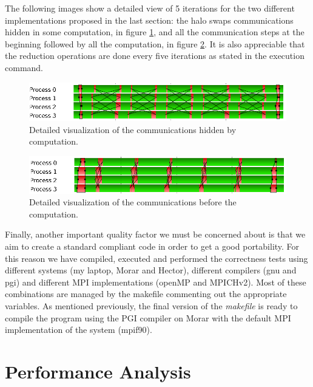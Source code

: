 \documentclass[12pt, a4paper, oneside]{article}
\begin{document}
The following images show a detailed view of 5 iterations for the two different implementations proposed in the last section: the halo swaps communications hidden in some computation, in figure \ref{figure:detail1}, and all the communication steps at the beginning followed by all the computation, in figure \ref{figure:detail2}. It is also appreciable that the reduction operations are done every five iterations as stated in the execution command.

\begin{figure}[htbp]
 \centering
 \includegraphics[width=\textwidth]{detailhiden}
 \caption{Detailed visualization of the communications hidden by computation.}
 \label{figure:detail1}
\end{figure}

\begin{figure}[htbp]
 \centering
 \includegraphics[width=\textwidth]{detailnothiden}
 \caption{Detailed visualization of the communications before the computation.}
 \label{figure:detail2}
\end{figure}




Finally, another important quality factor we must be concerned about is that we aim to create a standard compliant code in order to get a good portability.
For this reason we have compiled, executed and performed the correctness tests using different systems (my laptop, Morar and Hector), different compilers (gnu and pgi) and different MPI implementations (openMP and MPICHv2).
Most of these combinations are managed by the makefile commenting out the appropriate variables. As mentioned previously, the final version of the \emph{makefile} is ready to compile the program using the PGI compiler on Morar with the default MPI implementation of the system (mpif90).


\section{Performance Analysis}
\end{document}
